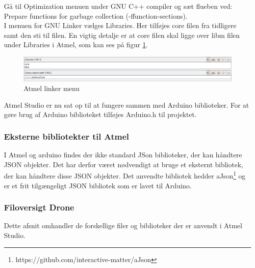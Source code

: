 Gå til Optimization menuen under GNU C++ compiler og sæt flueben ved: Prepare functions for garbage collection (-ffunction-sections).\\

I menuen for GNU Linker vælges Libraries. Her tilføjes core filen fra tidligere samt den sti til filen. En vigtig detalje er at core filen skal ligge over libm filen under Libraries i Atmel, som kan ses på figur \ref{fig:atmel_libraries}.

\begin{figure}[H]
	\centering
	\includegraphics[width=1\textwidth]{Billeder/implementation/Howtoguide/atmel_linker.png}
	\caption{Atmel linker menu}
	\label{fig:atmel_libraries}
\end{figure}

Atmel Studio er nu sat op til at fungere sammen med Arduino biblioteker. For at gøre brug af Arduino biblioteket tilføjes Arduino.h til projektet.

\subsubsection*{Eksterne bibliotekter til Atmel}

I Atmel og arduino findes der ikke standard JSon biblioteker, der kan håndtere JSON objekter. Det har derfor været nødvendigt at bruge et eksternt bibliotek, der kan håndtere disse JSON objekter.
Det anvendte bibliotek hedder aJson\footnote{https://github.com/interactive-matter/aJson} og er et frit tilgængeligt JSON bibliotek som er lavet til Arduino.


\subsubsection*{Filoversigt Drone}

Dette afsnit omhandler de forskellige filer og biblioteker der er anvendt i Atmel Studio. 


